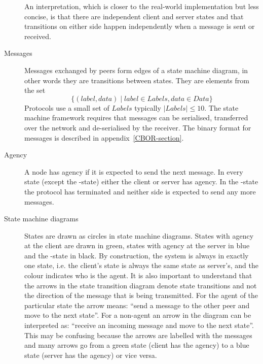\begin{description}
  An interpretation, which is closer to the real-world implementation but
  less concise, is that there are independent client and server states
  and that transitions on either side happen independently when a message is sent or received.

\item[Messages]
  Messages exchanged by peers form edges of a state machine diagram, in other
  words they are transitions between states.
  They are elements from the set
  $$\{(label, data) \mid label \in Labels, data \in Data\}$$
  Protocols use a small set of $Labels$ typically $|Labels| \leq 10$.
  The state machine framework requires that messages can be serialised,
  transferred over the network and de-serialised by the receiver.
  The binary format for messages is described in appendix~\ref{CBOR-section}.

\item[Agency]
  A node has agency if it is expected to send the next message.
  In every state (except the \Done-state) either the client or server has agency.
  In the \Done-state the protocol has terminated and neither side is expected to send any more
  messages.

\item [State machine diagrams]
      States are drawn as circles in state machine diagrams.
      States with agency at the client are drawn in green, states with agency at the server in blue and
      the \Done-state in black.
      By construction, the system is always in exactly one state,
      i.e. the client's state is always the same state as server's,
      and the colour indicates who is the agent.
      It is also important to understand that the arrows in the state transition diagram denote
      state transitions and not the direction of the message that is being transmitted.
      For the agent of the particular state the arrow means: ``send a message to the
      other peer and move to the next state''.
      For a non-agent an arrow in the diagram can be interpreted as:
      ``receive an incoming message and move to the next state''.
      This may be confusing because the arrows are labelled with the messages and
      many arrows go from a green state (client has the agency) to a blue
      state (server has the agency) or vice versa.



\end{description}
